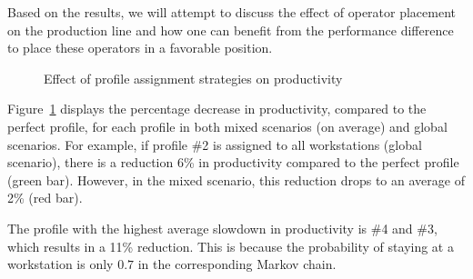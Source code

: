 \documentclass[review,12pt, 3p, times]{elsarticle}
\begin{document}
Based on the results, we will attempt to discuss the effect of operator placement on the production line and how one can benefit from the performance difference to place these operators in a favorable position.

\begin{figure}[htbp]
    \centering								
    \caption{Effect of profile assignment strategies on productivity}
    \label{fig:glo_mix}
\end{figure}

Figure~\ref{fig:glo_mix} displays the percentage decrease in productivity, compared to the perfect profile, 
for each profile in both mixed scenarios (on average) and global scenarios. For example, if profile \#2 is assigned to all workstations (global scenario), there is a reduction 6\% in productivity compared to the perfect profile (green bar). However, in the mixed scenario, this reduction drops to an average of 2\% (red bar).

The profile with the highest average slowdown in productivity is \#4 and  \#3, which results in a 11\% reduction. This is because the probability of staying at a workstation is only $0.7$ in the corresponding Markov chain.
\end{document}
